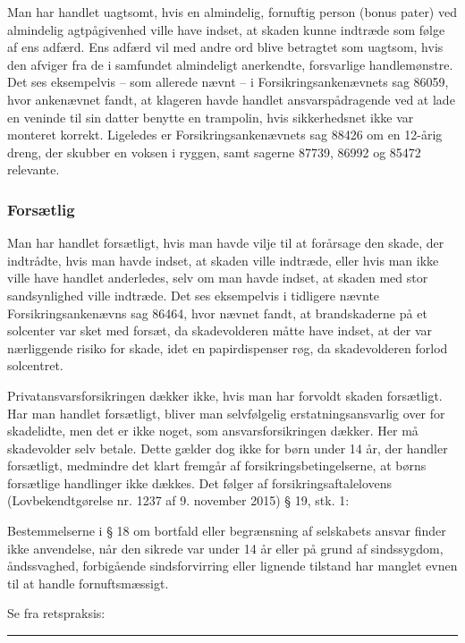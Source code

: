 \documentclass[]{book}
\begin{document}
Man har handlet uagtsomt, hvis en almindelig, fornuftig person (bonus pater) ved almindelig agtpågivenhed ville have indset, at skaden kunne indtræde som følge af ens adfærd. Ens adfærd vil med andre ord blive betragtet som uagtsom, hvis den afviger fra de i samfundet almindeligt anerkendte, forsvarlige handlemønstre. Det ses eksempelvis -- som allerede nævnt -- i Forsikringsankenævnets sag 86059, hvor ankenævnet fandt, at klageren havde handlet ansvarspådragende ved at lade en veninde til sin datter benytte en trampolin, hvis sikkerhedsnet ikke var monteret korrekt. Ligeledes er Forsikringsankenævnets sag 88426 om en 12-årig dreng, der skubber en voksen i ryggen, samt sagerne 87739, 86992 og 85472 relevante.

\hypertarget{forstlig}{%
\subsubsection{Forsætlig}\label{forstlig}}

Man har handlet forsætligt, hvis man havde vilje til at forårsage den skade, der indtrådte, hvis man havde indset, at skaden ville indtræde, eller hvis man ikke ville have handlet anderledes, selv om man havde indset, at skaden med stor sandsynlighed ville indtræde. Det ses eksempelvis i tidligere nævnte Forsikringsankenævns sag 86464, hvor nævnet fandt, at brandskaderne på et solcenter var sket med forsæt, da skadevolderen måtte have indset, at der var nærliggende risiko for skade, idet en papirdispenser røg, da skadevolderen forlod solcentret.

Privatansvarsforsikringen dækker ikke, hvis man har forvoldt skaden forsætligt. Har man handlet forsætligt, bliver man selvfølgelig erstatningsansvarlig over for skadelidte, men det er ikke noget, som ansvarsforsikringen dækker. Her må skadevolder selv betale. Dette gælder dog ikke for børn under 14 år, der handler forsætligt, medmindre det klart fremgår af forsikringsbetingelserne, at børns forsætlige handlinger ikke dækkes. Det følger af forsikringsaftalelovens (Lovbekendtgørelse nr. 1237 af 9. november 2015) § 19, stk. 1:

Bestemmelserne i § 18 om bortfald eller begrænsning af selskabets ansvar finder ikke anvendelse, når den sikrede var under 14 år eller på grund af sindssygdom, åndssvaghed, forbigående sindsforvirring eller lignende tilstand har manglet evnen til at handle fornuftsmæssigt.

Se fra retspraksis:

\begin{center}\rule{0.5\linewidth}{\linethickness}\end{center}
\end{document}
